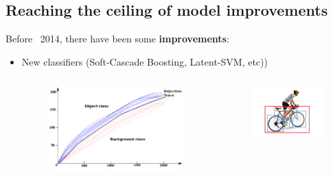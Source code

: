 \documentclass{beamer}[10pt, usepdftitle=false, handout]
\begin{document}
	\subsection{Reaching the ceiling of model improvements}    
    
    \begin{frame}
	
	Before ~2014, there have been some \textbf{improvements}:
	\vspace*{1em}
	
	\begin{itemize}
	\item{New classifiers (Soft-Cascade Boosting, Latent-SVM, etc))
	\begin{columns}
\begin{column}{0.5\textwidth}
	 \begin{figure}
		\includegraphics[scale=0.20]{21.png} 
	\end{figure}	
\end{column}
\begin{column}{0.5\textwidth}  %
    \begin{center}
     	\begin{figure}
		\includegraphics[scale=0.20]{20e.jpg} 
	\end{figure}
     

\end{center}
\end{column}
\end{columns}}
\end{itemize}
\end{frame}
\end{document}

